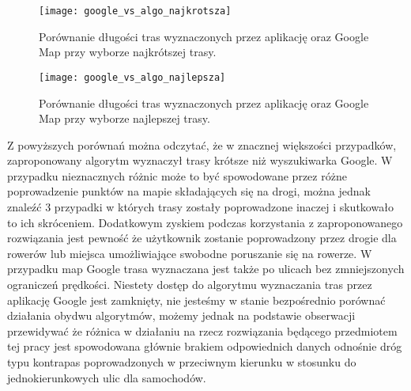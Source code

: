 \begin{figure}[H]
\centering
\texttt{[image: google\_vs\_algo\_najkrotsza]}
\caption{Porównanie długości tras wyznaczonych przez aplikację oraz Google Map przy wyborze najkrótszej trasy.}
\end{figure}

\begin{figure}[H]
\centering
\texttt{[image: google\_vs\_algo\_najlepsza]}
\caption{Porównanie długości tras wyznaczonych przez aplikację oraz Google Map przy wyborze najlepszej trasy.}
\end{figure}

Z powyższych porównań można odczytać, że w znacznej większości przypadków, zaproponowany algorytm wyznaczył trasy krótsze niż wyszukiwarka Google. W przypadku nieznacznych różnic może to być spowodowane przez różne poprowadzenie punktów na mapie składających się na drogi, można jednak znaleźć 3 przypadki w których trasy zostały poprowadzone inaczej i skutkowało to ich skróceniem. Dodatkowym zyskiem podczas korzystania z zaproponowanego rozwiązania jest pewność że użytkownik zostanie poprowadzony przez drogie dla rowerów lub miejsca umożliwiające swobodne poruszanie się na rowerze. W przypadku map Google trasa wyznaczana jest także po ulicach bez zmniejszonych ograniczeń prędkości. Niestety dostęp do algorytmu wyznaczania tras przez aplikację Google jest zamknięty, nie jesteśmy w stanie bezpośrednio porównać działania obydwu algorytmów, możemy jednak na podstawie obserwacji przewidywać że różnica w działaniu na rzecz rozwiązania będącego przedmiotem tej pracy jest spowodowana głównie brakiem odpowiednich danych odnośnie dróg typu kontrapas poprowadzonych w przeciwnym kierunku w stosunku do jednokierunkowych ulic dla samochodów.